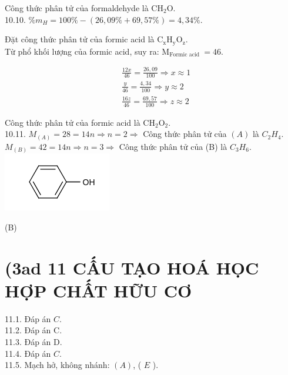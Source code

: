 \documentclass[10pt]{article}
\begin{document}
Công thức phân tử của formaldehyde là $\mathrm{CH}_{2} \mathrm{O}$.\\
10.10. $\% m_{H}=100 \%-(26,09 \%+69,57 \%)=4,34 \%$.

Đặt công thức phân tử của formic acid là $\mathrm{C}_{\mathrm{x}} \mathrm{H}_{\mathrm{y}} \mathrm{O}_{\mathrm{z}}$.\\
Từ phổ khối lượng của formic acid, suy ra: $\mathrm{M}_{\text {Formic acid }}=46$.

$$
\begin{aligned}
& \frac{12 x}{46}=\frac{26,09}{100} \Rightarrow x \approx 1 \\
& \frac{y}{46}=\frac{4,34}{100} \Rightarrow y \approx 2 \\
& \frac{16 z}{46}=\frac{69,57}{100} \Rightarrow z \approx 2
\end{aligned}
$$

Công thức phân tử của formic acid là $\mathrm{CH}_{2} \mathrm{O}_{2}$.\\
10.11. $M_{(A)}=28=14 n \Rightarrow n=2 \Rightarrow$ Công thức phân tử của $(A)$ là $C_{2} H_{4}$.\\
$M_{(B)}=42=14 n \Rightarrow n=3 \Rightarrow$ Công thức phân tử của (B) là $C_{3} H_{6}$.\\
\includegraphics{smile-ea6ef1ff42c3b60b097705893ab495201362acec}

(B)

\section*{(3ad 11 CẤU TẠO HOÁ HỌC HỢP CHẤT HỮU CƠ}
11.1. Đáp án $C$.\\
11.2. Đáp án C.\\
11.3. Đáp án D.\\
11.4. Đáp án $C$.\\
11.5. Mạch hở, không nhánh: $(A)$, ( $E$ ).
\end{document}
